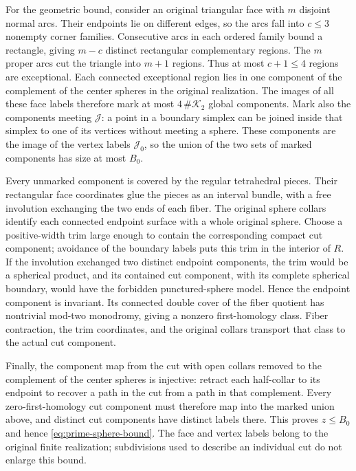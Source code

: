 For the geometric bound, consider an original triangular face with $m$
disjoint normal arcs. Their endpoints lie on different edges, so the arcs
fall into $c\leq3$ nonempty corner families. Consecutive arcs in each
ordered family bound a rectangle, giving $m-c$ distinct rectangular
complementary regions. The $m$ proper arcs cut the triangle into $m+1$
regions. Thus at most $c+1\leq4$ regions are exceptional. Each connected
exceptional region lies in one component of the complement of the center
spheres in the original realization. The images of all these face labels
therefore mark at most $4\,\#\mathcal K_2$ global components. Mark also
the components meeting $\mathcal J$: a point in a boundary simplex can
be joined inside that simplex to one of its vertices without meeting a
sphere. These components are the image of the vertex labels
$\mathcal J_0$, so the union of the two sets of marked components has
size at most $B_0$.

Every unmarked component is covered by the regular tetrahedral pieces.
Their rectangular face coordinates glue the pieces as an interval bundle,
with a free involution exchanging the two ends of each fiber. The original
sphere collars identify each connected endpoint surface with a whole
original sphere. Choose a positive-width trim large enough to contain the
corresponding compact cut component; avoidance of the boundary labels puts
this trim in the interior of $R$. If the involution exchanged two distinct
endpoint components, the trim would be a spherical product, and its
contained cut component, with its complete spherical boundary, would have
the forbidden punctured-sphere model. Hence the endpoint component is
invariant. Its connected double cover of the fiber quotient has nontrivial
mod-two monodromy, giving a nonzero first-homology class. Fiber contraction,
the trim coordinates, and the original collars transport that class to the
actual cut component.

Finally, the component map from the cut with open collars removed to the
complement of the center spheres is injective: retract each half-collar to
its endpoint to recover a path in the cut from a path in that complement.
Every zero-first-homology cut component must therefore map into the marked
union above, and distinct cut components have distinct labels there. This
proves $z\leq B_0$ and hence \eqref{eq:prime-sphere-bound}. The face and
vertex labels belong to the original finite realization; subdivisions
used to describe an individual cut do not enlarge this bound.

